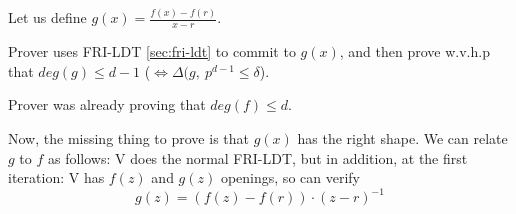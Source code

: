 \documentclass{article}
\theoremstyle{definition}
\begin{document}
Let us define $g(x) = \frac{f(x)-f(r)}{x-r}$.

Prover uses FRI-LDT \ref{sec:fri-ldt} to commit to $g(x)$, and then prove w.v.h.p that $deg(g) \leq d-1$ ($\Longleftrightarrow \Delta(g,~ p^{d-1} \leq \delta$).

Prover was already proving that $deg(f) \leq d$.

Now, the missing thing to prove is that $g(x)$ has the right shape. We can relate $g$ to $f$ as follows:
V does the normal FRI-LDT, but in addition, at the first iteration:
V has $f(z)$ and $g(z)$ openings, so can verify
$$g(z) = (f(z)-f(r))\cdot (z-r)^{-1}$$




\end{document}
